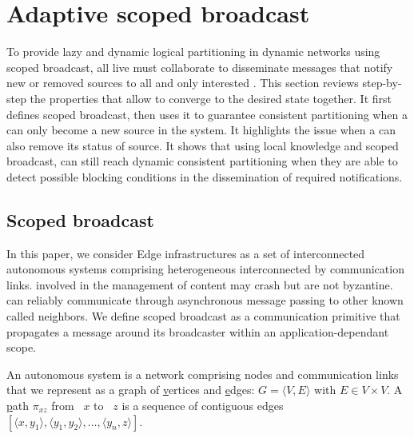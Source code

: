 
\section{Adaptive scoped broadcast}
\label{sec:adaptive}

To provide lazy and dynamic logical partitioning in dynamic networks
using scoped broadcast, all live \processes must collaborate to
disseminate messages that notify new or removed sources to all and
only interested \processes. This section reviews step-by-step the
properties that allow \processes to converge to the desired state
together. It first defines scoped broadcast, then uses it to guarantee
consistent partitioning when a \process can only become a new source
in the system. It highlights the issue when a \process can also remove
its status of source. It shows that using local knowledge and scoped
broadcast, \processes can still reach dynamic consistent partitioning
when they are able to detect possible blocking conditions in the
dissemination of required notifications. 

\subsection{Scoped broadcast}
\label{subsec:scoped}

In this paper, we consider Edge infrastructures as a set of
interconnected autonomous systems comprising heterogeneous \nodes
interconnected by communication links. \Processes involved in the
management of content may crash but are not byzantine.  \Processes can
reliably communicate through asynchronous message passing to other
known \processes called neighbors.  We define scoped broadcast as a
communication primitive that propagates a message around its
broadcaster within an application-dependant scope.

\begin{definition}
  An autonomous system is a network comprising nodes and communication
  links that we represent as a \underline{g}raph of
  \underline{v}ertices and \underline{e}dges:
  $G = \langle V, E \rangle$ with $E \in V \times V$. A
  \underline{p}ath $\pi_{xz}$ from \Process~$x$ to \Process~$z$ is a
  sequence of contiguous edges
  $[\langle x, y_1 \rangle, \langle y_1, y_2\rangle, \ldots, \langle
  y_n, z \rangle]$.
\end{definition}

